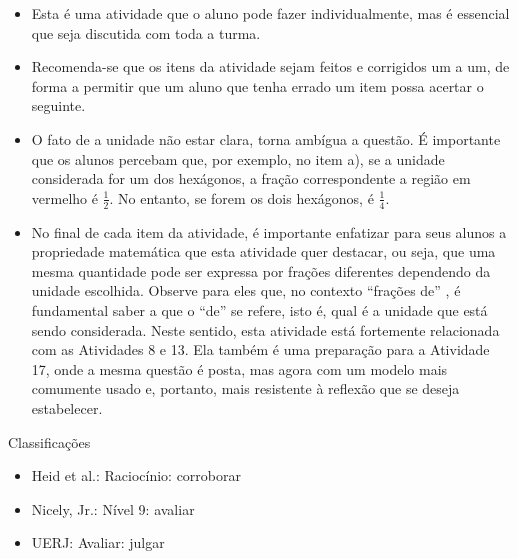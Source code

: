 \documentclass[oneside]{book}
\begin{document}
\begin{multicols}{2}
\begin{itemize} %
    \item       Esta é uma atividade que o aluno pode fazer individualmente, mas é essencial que seja discutida com toda a turma.
    \item       Recomenda-se que os itens da atividade sejam feitos e corrigidos um a um, de forma a permitir que um aluno que tenha errado um item possa acertar o seguinte.
    \item       O fato de a unidade não estar clara, torna ambígua a questão. É importante que os alunos percebam que, por exemplo, no item a), se a unidade considerada for um dos hexágonos, a fração correspondente a região em vermelho é $\frac{1}{2}$. No entanto, se forem os dois hexágonos, é $\frac{1}{4}$.
    \item       No final de cada item da atividade, é importante enfatizar para seus alunos a propriedade matemática que esta atividade quer destacar, ou seja, que uma mesma quantidade pode ser expressa por frações diferentes dependendo da unidade escolhida. Observe para eles que, no contexto       ``frações de''      , é fundamental saber a que o       ``de''       se refere, isto é, qual é a unidade que está sendo considerada. Neste sentido, esta atividade está fortemente relacionada com as Atividades 8 e 13. Ela também é uma preparação para a Atividade 17, onde a mesma questão é posta, mas agora com um modelo mais comumente usado e, portanto, mais resistente à reflexão que se deseja estabelecer.
\end{itemize} %


  Classificações
\begin{itemize} %
    \item       Heid et al.: Raciocínio: corroborar
    \item       Nicely, Jr.: Nível 9: avaliar
    \item       UERJ: Avaliar: julgar
\end{itemize} %

\def \tripinha{ (30:4) -- (90:4) -- (150:4)--(210:4)--(270:4)--(330:4) [shift={({4*sqrt(3)},0)}] --(270:4) -- (330:4) -- (30:4) -- (90:4)--(150:4)--cycle;}


\def \tripa{ (30:4) -- (90:4) -- (150:4)--(210:4)--(270:4)--(330:4) [shift={({4*sqrt(3)},0)}] --(270:4) -- (330:4) [shift={({4*sqrt(3)},0)}]--  (270:4) -- (330:4) -- (30:4) -- (90:4)--(150:4) [shift={({-4*sqrt(3)},0)}] -- (90:4) -- (150:4)--cycle;}

\def \tripalonga{ (30:4) -- (90:4) -- (150:4)--(210:4)--(270:4)--(330:4) [shift={({4*sqrt(3)},0)}] --(270:4) -- (330:4) [shift={({4*sqrt(3)},0)}] --(270:4) -- (330:4)[shift={({4*sqrt(3)},0)}] --(270:4) -- (330:4) [shift={({4*sqrt(3)},0)}]--  (270:4) -- (330:4) -- (30:4) -- (90:4)--(150:4) [shift={({-4*sqrt(3)},0)}] -- (90:4) -- (150:4)[shift={({-4*sqrt(3)},0)}] -- (90:4) -- (150:4) [shift={({-4*sqrt(3)},0)}] -- (90:4) -- (150:4)--cycle;}


\end{multicols}
\end{document}
